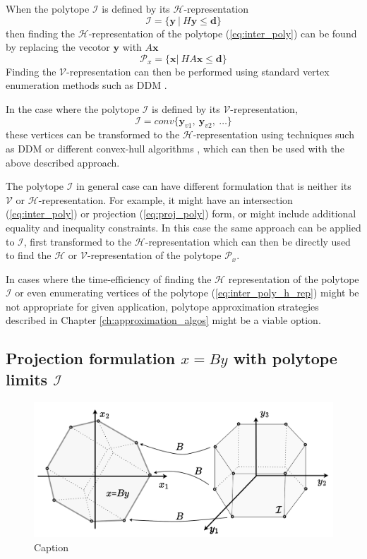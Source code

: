 When the polytope $\mathcal{I}$ is defined by its $\mathcal{H}$-representation 
\begin{equation}
    \mathcal{I} = \{ \bm{y} ~|~H\bm{y} \leq \bm{d}\}
\end{equation}
then finding the $\mathcal{H}$-representation of the polytope (\ref{eq:inter_poly}) can be found by replacing the vecotor $\bm{y}$ with $A\bm{x}$
\begin{equation}
    \mathcal{P}_x=\{\bm{x} |~ HA\bm{x} \leq \bm{d} \}
    \label{eq:inter_poly_h_rep}
\end{equation}
Finding the $\mathcal{V}$-representation can then be performed using standard vertex enumeration methods such as DDM \cite{fukuda_dd}. 

In the case where the polytope $\mathcal{I}$ is defined by its $\mathcal{V}$-representation, 
\begin{equation}
    \mathcal{I} = conv\{ \bm{y}_{v1}, ~ \bm{y}_{v2},~ \ldots\}
\end{equation}
these vertices can be transformed to the $\mathcal{H}$-representation using techniques such as DDM \cite{fukuda_dd} or different convex-hull algorithms \cite{Barber1996}, which can then be used with the above described approach.

The polytope $\mathcal{I}$ in general case can have different formulation that is neither its $\mathcal{V}$ or $\mathcal{H}$-representation. For example, it might have an intersection (\ref{eq:inter_poly}) or projection (\ref{eq:proj_poly}) form, or might include additional equality and inequality constraints. In this case the same approach can be applied to $\mathcal{I}$, first transformed to the $\mathcal{H}$-representation which can then be directly used to find the $\mathcal{H}$ or $\mathcal{V}$-representation of the polytope $\mathcal{P}_x$.

In cases where the time-efficiency of finding the $\mathcal{H}$ representation of the polytope $\mathcal{I}$ or even enumerating vertices of the polytope (\ref{eq:inter_poly_h_rep}) might be not appropriate for given application, polytope approximation strategies described in Chapter \ref{ch:approximation_algos} might be a viable option.

\subsection{Projection formulation $x=By$ with polytope limits $\mathcal{I}$}

\begin{figure}[h]
    \centering
    \includegraphics[width=0.7\linewidth]{Chapters/imgs/proj_poly.pdf}
    \caption{Caption}
    \label{fig:proj_poly}
\end{figure}

